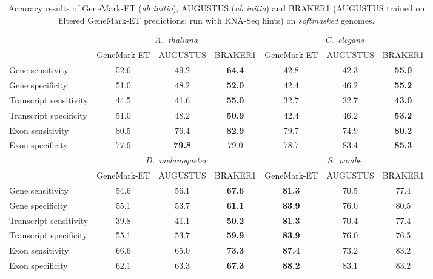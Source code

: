 \documentclass[a4paper,10pt]{report}
\begin{document}
\begin{table}
\begin{center}
 \begin{scriptsize}
 \begin{tabular}{|l|ccc|ccc|}
 \hline
& \multicolumn{3}{|c|}{\textit{A.~thaliana}} & \multicolumn{3}{|c|}{\textit{C.~elegans}}\\
& GeneMark-ET & AUGUSTUS & BRAKER1 & GeneMark-ET & AUGUSTUS & BRAKER1\\
\hline
Gene sensitivity        & 52.6 & 49.2 & \textbf{64.4} & 42.8 & 42.3 & \textbf{55.0}\\
Gene specificity        & 51.0 & 48.2 & \textbf{52.0} & 42.4 & 46.2 & \textbf{55.2}\\
Transcript sensitivity  & 44.5 & 41.6 & \textbf{55.0} & 32.7 & 32.7 & \textbf{43.0}\\
Transcript specificity  & 51.0 & 48.2 & \textbf{50.9} & 42.4 & 46.2 & \textbf{53.2}\\
Exon sensitivity        & 80.5 & 76.4 & \textbf{82.9} & 79.7 & 74.9 & \textbf{80.2}\\
Exon specificity        & 77.9 & \textbf{79.8} & 79.0 & 78.7 & 83.4 & \textbf{85.3}\\
\hline
& \multicolumn{3}{|c|}{\textit{D.~melanogaster}} & \multicolumn{3}{|c|}{\textit{S.~pombe}}\\
& GeneMark-ET & AUGUSTUS & BRAKER1 & GeneMark-ET & AUGUSTUS & BRAKER1\\
\hline
Gene sensitivity       & 54.6 & 56.1 & \textbf{67.6} & \textbf{81.3} & 70.5 & 77.4\\
Gene specificity       & 55.1 & 53.7 & \textbf{61.1} & \textbf{83.9} & 76.0 & 80.5\\
Transcript sensitivity & 39.8 & 41.1 & \textbf{50.2} & \textbf{81.3} & 70.4 & 77.4\\
Transcript specificity & 55.1 & 53.7 &\textbf{ 59.9} & \textbf{83.9} & 76.0 & 76.5\\
Exon sensitivity       & 66.6 & 65.0 & \textbf{73.3} & \textbf{87.4} & 73.2 & 83.2\\
Exon specificity       & 62.1 & 63.3 & \textbf{67.3} & \textbf{88.2} & 83.1 & 83.2\\
\hline
 \end{tabular}
\end{scriptsize}
\end{center}
\caption{Accuracy results of GeneMark-ET (\textit{ab initio}), AUGUSTUS (\textit{ab initio}) and BRAKER1 (AUGUSTUS trained on filtered GeneMark-ET predictions; run with RNA-Seq hints) on \textit{softmasked} genomes.
 \label{compare}}
\end{table}
\end{document}

